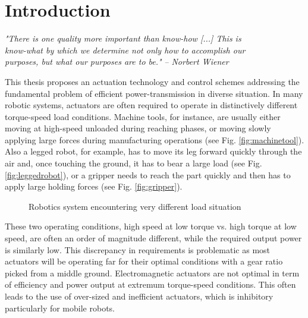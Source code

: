 \chapter{Introduction}
\label{sec:Introduction}

{
\begin{flushright}
\textit{"There is one quality more important than know-how [...] This is \\ know-what by which we determine not only how to accomplish our \\  purposes, but what our purposes are to be."} 
\emph{-- Norbert Wiener}
\end{flushright}
}
\vspace{10pt}



This thesis proposes an actuation technology and control schemes addressing the fundamental problem of efficient power-transmission in diverse situation. In many robotic systems, actuators are often required to operate in distinctively different torque-speed load conditions. Machine tools, for instance, are usually either moving at high-speed unloaded during reaching phases, or moving slowly applying large forces during manufacturing operations (see Fig. \ref{fig:machinetool}). Also a legged robot, for example, has to move its leg forward quickly through the air and, once touching the ground, it has to bear a large load (see Fig. \ref{fig:leggedrobot}), or a gripper needs to reach the part quickly and then has to apply large holding forces (see Fig. \ref{fig:gripper}).
%
\begin{figure}[H]
				\vspace{-10pt}
        \centering
        \caption{Robotics system encountering very different load situation}
				\label{fig:app}
\end{figure}

These two operating conditions, high speed at low torque vs. high torque at low speed, are often an order of magnitude different, while the required output power is similarly low. This discrepancy in requirements is problematic as most actuators will be operating far for their optimal conditions with a gear ratio picked from a middle ground. Electromagnetic actuators are not optimal in term of efficiency and power output at extremum torque-speed conditions. This often leads to the use of over-sized and inefficient actuators, which is inhibitory particularly for mobile robots.


